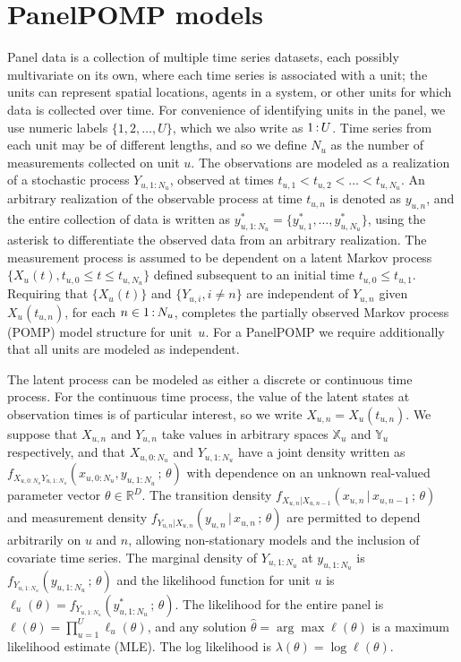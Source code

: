 \documentclass[12pt]{article}\usepackage[]{graphicx}\usepackage[table]{xcolor}
\newcommand\PanelPOMP{PanelPOMP}
\newcommand\mycolon{{\hspace{0.6mm}:\hspace{0.6mm}}}
\newcommand\unit{u} %
\newcommand\Unit{U} %
\newcommand\RealSpace{\mathbb{R}}
\newcommand\loglik{\lambda}
\newcommand\lik{\ell}
\newcommand\Xspace{{\mathbb X}}
\newcommand\Yspace{{\mathbb Y}}
\newcommand\Thetadim{D}
\newcommand\given{{\, | \,}}
\newcommand\giventh{{\,;\,}}
\begin{document}
\section{PanelPOMP models} \label{sec:PanelPOMP}

Panel data is a collection of multiple time series datasets, each possibly multivariate on its own, where each time series is associated with a unit; the units can represent spatial locations, agents in a system, or other units for which data is collected over time.
For convenience of identifying units in the panel, we use numeric labels $\{1,2,\dots,\Unit\}$, which we also write as $1\mycolon\Unit$.
Time series from each unit may be of different lengths, and so we define $N_\unit$ as the number of measurements collected on unit $\unit$.
The observations are modeled as a realization of a stochastic process $Y_{\unit,1:N_\unit}$, observed at times $t_{\unit,1}<t_{\unit,2}<\dots<t_{\unit,N_\unit}$.
An arbitrary realization of the observable process at time $t_{\unit,n}$ is denoted as $y_{\unit,n}$, and the entire collection of data is written as $y^*_{\unit,1:N_{\unit}} = \{y^*_{\unit,1},\dots,y^*_{\unit,N_\unit}\}$, using the asterisk to differentiate the observed data from an arbitrary realization.
The measurement process is assumed to be dependent on a latent Markov process $\{X_\unit(t),t_{\unit,0}\le t\le t_{\unit,N_\unit}\}$ defined subsequent to an initial time $t_{\unit,0}\le t_{\unit,1}$.
Requiring that $\{X_\unit(t)\}$ and $\{Y_{\unit,i},i\neq n\}$ are independent of $Y_{\unit,n}$ given $X_\unit(t_{\unit,n})$, for each $n\in 1\mycolon N_{\unit}$, completes the partially observed Markov process (POMP) model structure for unit~$\unit$.
For a {\PanelPOMP} we require additionally that all units are modeled as independent.

The latent process can be modeled as either a discrete or continuous time process.
For the continuous time process, the value of the latent states at observation times is of particular interest, so we write $X_{\unit,n}=X_\unit(t_{\unit,n})$.
We suppose that $X_{\unit,n}$ and $Y_{\unit,n}$ take values in arbitrary spaces $\Xspace_{\unit}$ and $\Yspace_{\unit}$ respectively, and that $X_{\unit,0:N_\unit}$ and $Y_{\unit,1:N_\unit}$ have a joint density written as $f_{X_{\unit,0:N_\unit}Y_{\unit,1:N_\unit}}(x_{\unit,0:N_\unit},y_{\unit,1:N_\unit}\giventh\theta)$ with dependence on an unknown real-valued parameter vector $\theta\in\RealSpace^{\Thetadim}$.
The transition density
$f_{X_{\unit,n}|X_{\unit,n-1}}(x_{\unit,n}\given x_{\unit,n-1}\giventh\theta)$
and measurement density
$f_{Y_{\unit,n}|X_{\unit,n}}(y_{\unit,n}\given x_{\unit,n}\giventh\theta)$
are permitted to depend arbitrarily on $u$ and $n$, allowing non-stationary models and the inclusion of covariate time series.
The marginal density of $Y_{\unit,1:N_\unit}$ at $y_{\unit,1:N_\unit}$ is $f_{Y_{\unit,1:N_\unit}}(y_{\unit,1:N_\unit}\giventh\theta)$ and the likelihood function for unit $\unit$ is
$\lik_{\unit}(\theta) = f_{Y_{\unit,1:N_\unit}}(y^*_{\unit,1:N_\unit}\giventh\theta)$.
The likelihood for the entire panel is
$\lik(\theta) = \prod_{\unit=1}^{\Unit} \lik_{\unit}(\theta)$,
and any solution $\hat\theta=\arg\max\lik(\theta)$ is a maximum likelihood estimate (MLE).
The log likelihood is $\loglik(\theta)=\log \lik(\theta)$.
\end{document}
